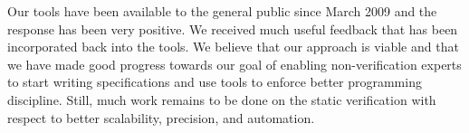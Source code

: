 \documentclass{llncs}
\begin{document}
Our tools have been available to the general public since March 2009
and the response has been very positive. We received much useful
feedback that has been incorporated back into the tools. We believe
that our approach is viable and that we have made good progress
towards our goal of enabling non-verification experts to start writing
specifications and use tools to enforce better programming
discipline. Still, much work remains to be done on the static
verification with respect to better scalability, precision, and
automation.



\end{document}

